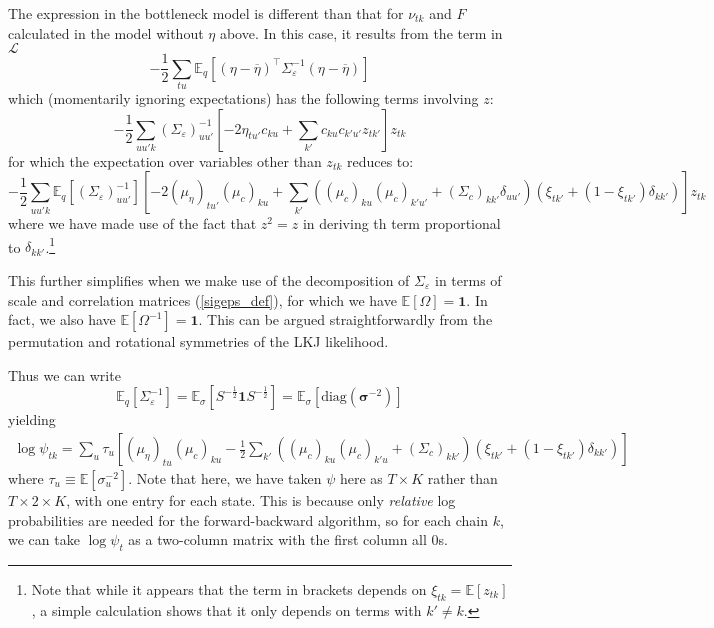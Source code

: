 \documentclass[11pt]{article}
\begin{document}
The expression in the bottleneck model is different than that for $\nu_{tk}$ and $F$ calculated in the model without $\eta$ above. In this case, it results from the term in $\mathcal{L}$
\begin{equation}
    - \frac{1}{2} \sum_{tu} \mathbb{E}_q \left[
    (\eta - \overline{\eta})^\top \Sigma_\varepsilon^{-1}(\eta - \overline{\eta}) \right]
\end{equation}
which (momentarily ignoring expectations) has the following terms involving $z$:
\begin{equation}
    -\frac{1}{2}\sum_{uu'k}\left(\Sigma_\varepsilon\right)^{-1}_{uu'} \left[-2\eta_{tu'} c_{ku} + \sum_{k'}c_{ku}c_{k'u'}z_{tk'}\right]z_{tk}
\end{equation}
for which the expectation over variables other than $z_{tk}$ reduces to:
\begin{equation}
    -\frac{1}{2}\sum_{uu'k}\mathbb{E}_q\left[\left(\Sigma_\varepsilon\right)^{-1}_{uu'}\right] \left[-2(\mu_\eta)_{tu'} (\mu_c)_{ku} + \sum_{k'}((\mu_c)_{ku}(\mu_c)_{k'u'} + (\Sigma_c)_{kk'}\delta_{uu'})(\xi_{tk'} + (1 - \xi_{tk'})\delta_{kk'})\right]z_{tk}
\end{equation}
where we have made use of the fact that $z^2 = z$ in deriving th term proportional to $\delta_{kk'}$.\footnote{Note that while it appears that the term in brackets depends on $\xi_{tk} = \mathbb{E}[z_{tk}]$, a simple calculation shows that it only depends on terms with $k' \neq k$.}

This further simplifies when we make use of the decomposition of $\Sigma_\varepsilon$ in terms of scale and correlation matrices (\ref{sigeps_def}), for which we have $\mathbb{E}[\Omega] = \mathbf{1}$. In fact, we also have $\mathbb{E}[\Omega^{-1}] = \mathbf{1}$. This can be argued straightforwardly from the permutation and rotational symmetries of the LKJ likelihood.

Thus we can write
\begin{equation}
    \mathbb{E}_q\left[\Sigma_\varepsilon^{-1}\right] =
    \mathbb{E}_\sigma \left[ S^{-\frac{1}{2}} \mathbf{1} S^{-\frac{1}{2}}\right]
    = \mathbb{E}_\sigma \left[\mathrm{diag}(\boldsymbol{\sigma}^{-2}) \right]
\end{equation}
yielding
\begin{align}
    \log \psi_{tk} = \sum_u \tau_u \left[(\mu_\eta)_{tu} (\mu_c)_{ku} - \frac{1}{2} \sum_{k'}((\mu_c)_{ku}(\mu_c)_{k'u} + (\Sigma_c)_{kk'})(\xi_{tk'} + (1 - \xi_{tk'})\delta_{kk'})\right]
\end{align}
where $\tau_u \equiv \mathbb{E}[\sigma_u^{-2}]$.
Note that here, we have taken $\psi$ here as $T \times K$ rather than $T \times 2 \times K$, with one entry for each state. This is because only \emph{relative} log probabilities are needed for the forward-backward algorithm, so for each chain $k$, we can take $\log \psi_t$ as a two-column matrix with the first column all 0s.
\end{document}
